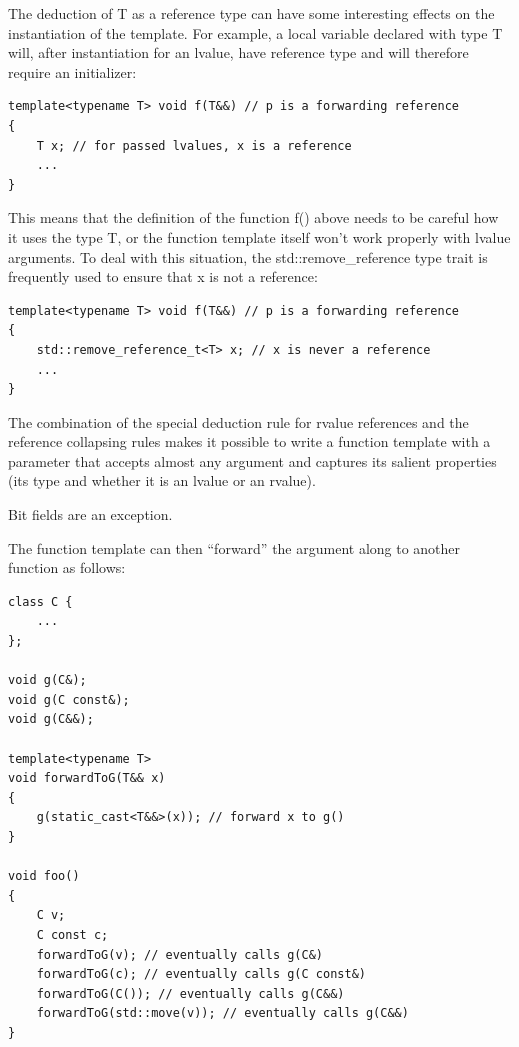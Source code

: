 The deduction of T as a reference type can have some interesting effects on the instantiation of the template. For example, a local variable declared with type T will, after instantiation for an lvalue, have reference type and will therefore require an initializer:

\begin{lstlisting}[style=styleCXX]
template<typename T> void f(T&&) // p is a forwarding reference
{
	T x; // for passed lvalues, x is a reference
	...
}
\end{lstlisting}

This means that the definition of the function f() above needs to be careful how it uses the type T, or the function template itself won’t work properly with lvalue arguments. To deal with this situation, the std::remove\_reference type trait is frequently used to ensure that x is not a reference:

\begin{lstlisting}[style=styleCXX]
template<typename T> void f(T&&) // p is a forwarding reference
{
	std::remove_reference_t<T> x; // x is never a reference
	...
}
\end{lstlisting}



The combination of the special deduction rule for rvalue references and the reference collapsing rules makes it possible to write a function template with a parameter that accepts almost any argument and captures its salient properties (its type and whether it is an lvalue or an rvalue).

\begin{tcolorbox}[colback=webgreen!5!white,colframe=webgreen!75!black]
\hspace*{0.75cm}Bit fields are an exception.
\end{tcolorbox}

The function template can then “forward” the argument along to another function as follows:

\begin{lstlisting}[style=styleCXX]
class C {
	...
};

void g(C&);
void g(C const&);
void g(C&&);

template<typename T>
void forwardToG(T&& x)
{
	g(static_cast<T&&>(x)); // forward x to g()
}

void foo()
{
	C v;
	C const c;
	forwardToG(v); // eventually calls g(C&)
	forwardToG(c); // eventually calls g(C const&)
	forwardToG(C()); // eventually calls g(C&&)
	forwardToG(std::move(v)); // eventually calls g(C&&)
}
\end{lstlisting}

